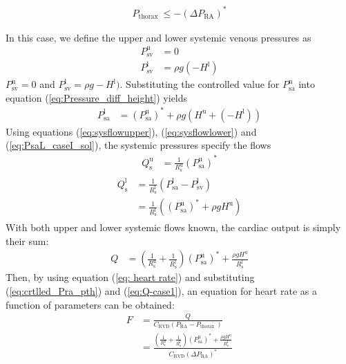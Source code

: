\documentclass[12pt]{article}
\begin{document}
\begin{align}
    P_{\text {thorax }} \leq-\left(\Delta P_{\text{RA}}\right)^{*}
\end{align}
\vspace*{-\baselineskip}

In this case, we define the upper and lower systemic venous pressures as 
\begin{align}
    P^\text{u}_\text{sv}&=0  \\
    P^\text{l}_\text{sv}&=\rho g (-H^\text{l})
\end{align}
\( P_\text{sv}^\text{u} =0 \) and \( P_\text{sv}^\text{l} =\rho g-H^\text{l}) \).
Substituting the controlled value for $P_{\text{sa}}^\text{u}$ into equation (\ref{eq:Pressure_diff_height}) yields 
\begin{align}
    P_\text{sa}^\text{l} &=\left(P_{\text{sa}}^\text{u}\right)^{*}+\rho g\left(H^\text{u}+\left(-H^{\text{l}}\right)\right) \label{eq:PsaL_caseI_sol}
\end{align}
Using equations (\ref{eq:sysflowupper}), (\ref{eq:sysflowlower}) and (\ref{eq:PsaL_caseI_sol}), the systemic pressures specify the flows 
\begin{align}
Q_\text{s}^\text{u} &=\frac{1}{R_\text{s}^\text{u}}\left(P_{\text{sa}}^\text{u}\right)^{*} 
\end{align}
\begin{align}
\begin{split}
    Q_\text{s}^\text{l} &= {} \frac{1}{R_\text{s}^\text{l}}\left(P_\text{sa}^\text{l}-P_\text{sv}^\text{l}\right) \\
& = \frac{1}{R_\text{s}^\text{l}}\left(\left(P_{\text{sa}}^\text{u}\right)^{*}+\rho g H^\text{u}\right)
\end{split}
\end{align}
With both upper and lower systemic flows known, the cardiac output is simply their sum: 
\begin{align}
  Q &=  \left(\frac{1}{R_\text{s}^\text{u}}+\frac{1}{R_\text{s}^\text{l}}\right)\left(P_{\text{sa}}^\text{u}\right)^{*}+\frac{\rho g H^\text{u}}{R_\text{s}^\text{l}}     \label{eq:Q-case1}
\end{align}
Then, by using equation (\ref{eq: heart rate}) and substituting (\ref{eq:crtlled_Pra_pth}) and (\ref{eq:Q-case1}), an equation for heart rate as a function of parameters can be obtained: 
\begin{align}
 F &=\frac{Q}{C_\text{RVD}\left(P_{\text{RA}}-P_{\text {thorax }}\right)} \label{eq: heartrate2} \\
&=\frac{\left(\frac{1}{R_\text{s}^\text{u}}+\frac{1}{R_\text{s}^\text{l}}\right)\left(P_{\text{sa}}^\text{u}\right)^{*}+\frac{\rho g H^\text{u}}{R_\text{s}^\text{l}}}{C_\text{RVD}\left(\Delta P_{\text{RA}}\right)^{*}}
\end{align}
\end{document}
